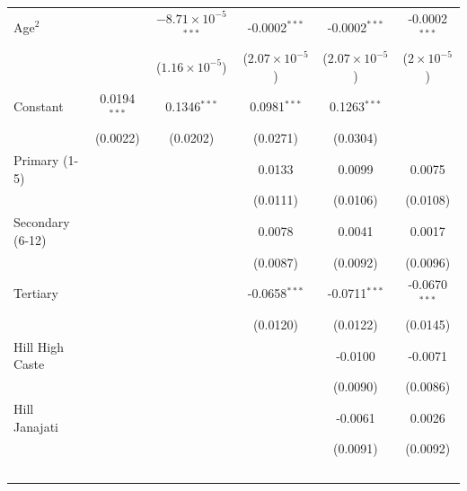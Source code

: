 \begin{tabular}{lccccc}
   Age$^2$                           &                & $-8.71\times 10^{-5}$$^{***}$  & -0.0002$^{***}$         & -0.0002$^{***}$         & -0.0002$^{***}$\\   
                                     &                & ($1.16\times 10^{-5}$)         & ($2.07\times 10^{-5}$)  & ($2.07\times 10^{-5}$)  & ($2\times 10^{-5}$)\\    
   Constant                          & 0.0194$^{***}$ & 0.1346$^{***}$                 & 0.0981$^{***}$          & 0.1263$^{***}$          &   \\   
                                     & (0.0022)       & (0.0202)                       & (0.0271)                & (0.0304)                &   \\   
   Primary (1-5)                     &                &                                & 0.0133                  & 0.0099                  & 0.0075\\   
                                     &                &                                & (0.0111)                & (0.0106)                & (0.0108)\\   
   Secondary (6-12)                  &                &                                & 0.0078                  & 0.0041                  & 0.0017\\   
                                     &                &                                & (0.0087)                & (0.0092)                & (0.0096)\\   
   Tertiary                          &                &                                & -0.0658$^{***}$         & -0.0711$^{***}$         & -0.0670$^{***}$\\   
                                     &                &                                & (0.0120)                & (0.0122)                & (0.0145)\\   
   Hill High Caste                   &                &                                &                         & -0.0100                 & -0.0071\\   
                                     &                &                                &                         & (0.0090)                & (0.0086)\\   
   Hill Janajati                     &                &                                &                         & -0.0061                 & 0.0026\\   
                                     &                &                                &                         & (0.0091)                & (0.0092)\\   
$$
\end{tabular}

